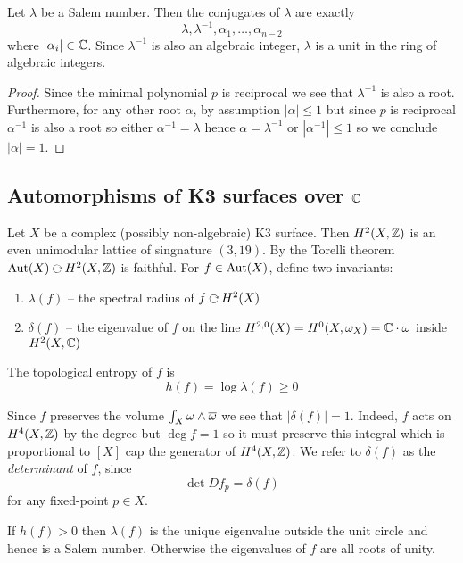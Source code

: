 \documentclass[12pt]{article}
\begin{document}
\begin{cor}
Let $\lambda$ be a Salem number. Then the conjugates of $\lambda$ are exactly
\[ \lambda, \lambda^{-1}, \alpha_1, \dots, \alpha_{n-2} \]
where $|\alpha_i| \in \mathbb{C}$. Since $\lambda^{-1}$ is also an algebraic integer, $\lambda$ is a unit in the ring of algebraic integers. 
\end{cor}

\begin{proof}
Since the minimal polynomial $p$ is reciprocal we see that $\lambda^{-1}$ is also a root. Furthermore, for any other root $\alpha$, by assumption $|\alpha| \le 1$ but since $p$ is reciprocal $\alpha^{-1}$ is also a root so either $\alpha^{-1} = \lambda$ hence $\alpha = \lambda^{-1}$ or $|\alpha^{-1}| \le 1$ so we conclude $|\alpha| = 1$.
\end{proof}

\subsection{Automorphisms of K3 surfaces over $\mathbb{C}$}

Let $X$ be a complex (possibly non-algebraic) K3 surface. Then $H^2(X, \mathbb{Z})$ is an even unimodular lattice of singnature $(3, 19)$. By the Torelli theorem $\Aut(X) \acts H^2(X, \Z)$ is faithful. For $f \in \mathrm{Aut}(X)$, define two invariants:
\begin{enumerate}
\item $\lambda(f)$ -- the spectral radius of $f \acts H^2(X)$
\item $\delta(f)$ -- the eigenvalue of $f$ on the line $H^{2,0}(X) = H^0(X, \omega_X) = \mathbb{C} \cdot \omega$ inside $H^2(X, \mathbb{C})$
\end{enumerate}
The topological entropy of $f$ is 
\[ h(f) = \log{\lambda(f)} \ge 0 \]

\begin{rmk}
Since $f$ preserves the volume $\int_X \omega \wedge \overline{\omega}$ we see that $|\delta(f)| = 1$. Indeed, $f$ acts on $H^4(X,\mathbb{Z})$ by the degree but $\deg{f} = 1$ so it must preserve this integral which is proportional to $[X]$ cap the generator of $H^4(X, \mathbb{Z})$. We refer to $\delta(f)$ as the \textit{determinant} of $f$, since
\[ \det{D f_p} = \delta(f) \]
for any fixed-point $p \in X$. 
\end{rmk}

\begin{prop}
If $h(f) > 0$ then $\lambda(f)$ is the unique eigenvalue outside the unit circle and hence is a Salem number. Otherwise the eigenvalues of $f$ are all roots of unity.
\end{prop}
\end{document}
